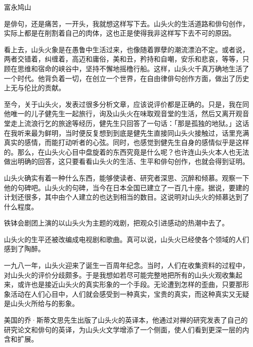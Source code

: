 {\FS

    \hfill 富永鸠山\footnotemark[1]


    \bigskip

    是俳句，还是痛苦\footnotemark[2]，一开头，我就想这样写下去。山头火的生活道路和俳句创作，实际上都是在削割着自己的肉体，这也正是使得我非这样写下去不可的原因。


    看上去，山头火象是在愚鲁中生活过来，也像随着罪孽的潮流漂泊不定。或者说，两者交错着，纠缠着，高迈和庸俗，美和丑，矜持和自嘲，安乐和悲哀，等等，只顾在思维和宿命的峡谷中，坚持不懈地摇橹行船。这样，山头火千真万确地生活了一个时代。他背负着一切，在创立一个世界，在自由律俳句创作方面，做出了历史上无与伦比的贡献。

    至今，关于山头火，发表过很多分析文章，应该说评价都是正确的。只是，我在同他唯一的儿子健先生一起旅行，询及山头火在味取观音堂的生活，然后又离开观音堂走上流浪行乞的旅途等经历，健先生只回答了一句话：「那是孤独的地狱。」这话在我听来最为鲜明，当时便反复想到到底是健先生直接同山头火接触过，话里充满真实的感情，而能打动听者的心弦。同时，也感觉到健先生自身的感情似乎是这样的。那么，在山头火心目中盘旋着的东西究竟是什么呢？也许连山头火本人也无法做出明确的回答，这只要看看山头火的生活、生平和俳句创作，也就会得到证明。

    山头火确实有着一种什么东西，能够使读者、研究者深思、沉醉和倾慕。观察一下他的句碑吧。山头火的句碑，当今在日本全国已建立了一百几十座。据说，要建的计划还很多，其中由个人建立的也达到相当的数目。这说明对山头火的倾慕达到了什么程度。

    铁钵会剧团上演的以山头火为主题的戏剧，把观众引进感动的热潮中去了。

    山头火的生平还被改编成电视剧和歌曲。真可以说，山头火已经使各个领域的人们感到了陶醉。

    一九八一年，山头火迎来了诞生一百周年纪念。当时，人们在收集资料的过程中，对山头火的评价分歧颇多。于是我想如若尽可能完整地把所有的山头火观收集起来，或许也是接近山头火的真实形象的一个手段。无论遭到怎样的歪曲，只要那形象活动在人们心目中，人们就会感受到一种真实，宝贵的真实，而这种真实又无疑是山头火所给与的影象。

    美国的乔·斯蒂文思先生出版了山头火的英译本，他通过对禅的研究发表了自己的研究论文和俳句的英译，为山头火文学增添了一个侧面，使人们看到更深一层的内含和扩展。

}

